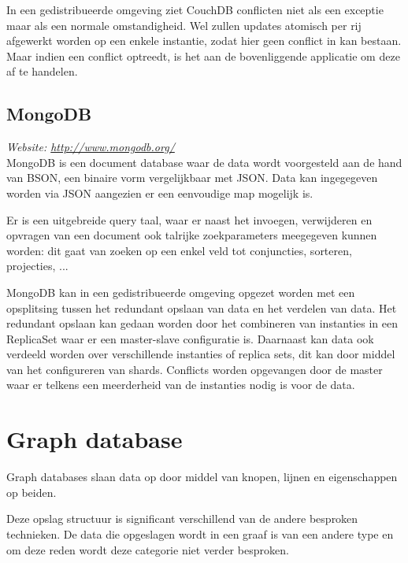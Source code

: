 In een gedistribueerde omgeving ziet CouchDB conflicten niet als een exceptie maar als een normale omstandigheid. Wel zullen updates atomisch per rij afgewerkt worden op een enkele instantie, zodat hier geen conflict in kan bestaan. Maar indien een conflict optreedt, is het aan de bovenliggende applicatie om deze af te handelen. 


\subsection{MongoDB}
\textit{Website: \url{http://www.mongodb.org/}}\\
MongoDB is een document database waar de data wordt voorgesteld aan de hand van BSON, een binaire vorm vergelijkbaar met JSON. Data kan ingegegeven worden via JSON aangezien er een eenvoudige map mogelijk is. 

Er is een uitgebreide query taal, waar er naast het invoegen, verwijderen en opvragen van een document ook talrijke zoekparameters meegegeven kunnen worden: dit gaat van zoeken op een enkel veld tot conjuncties, sorteren, projecties, ... 

MongoDB kan in een gedistribueerde omgeving opgezet worden met een opsplitsing tussen het redundant opslaan van data en het verdelen van data. Het redundant opslaan kan gedaan worden door het combineren van instanties in een ReplicaSet waar er een master-slave configuratie is. Daarnaast kan data ook verdeeld worden over verschillende instanties of replica sets, dit kan door middel van het configureren van shards. 
Conflicts worden opgevangen door de master waar er telkens een meerderheid van de instanties nodig is voor de data. 

\section{Graph database}
Graph databases slaan data op door middel van knopen, lijnen en eigenschappen op beiden. 

Deze opslag structuur is significant verschillend van de andere besproken technieken. De data die opgeslagen wordt in een graaf is van een andere type en om deze reden wordt deze categorie niet verder besproken. 
 
